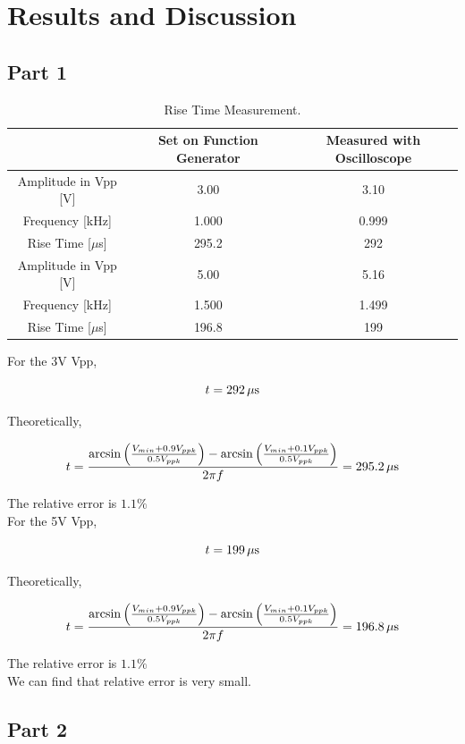 \documentclass{article}
\begin{document}
\section{Results and Discussion}

\subsection{Part 1}

\begin{table}[!h]
\begin{center}
\begin{tabular}{|c|c|c|}
\hline
 & Set on Function Generator & Measured with Oscilloscope \\
\hline
Amplitude in Vpp [V] 	&	3.00	&	3.10	\\
\hline
Frequency [kHz]			&	1.000	&	0.999	\\
\hline
Rise Time [$\mu$s]		&	295.2	&	292	\\
\hline
Amplitude in Vpp [V] 	&	5.00	&	5.16	\\
\hline
Frequency [kHz]			&	1.500	&	1.499	\\
\hline
Rise Time [$\mu$s]		&	196.8	&	199	\\
\hline
\end{tabular}
\caption{Rise Time Measurement.}
\label{tab-1}
\end{center}
\end{table}

For the 3V Vpp,

$$t=292\,\rm \mu s$$

Theoretically,

$$t=\frac{\arcsin\left(\frac{V_{min}+0.9V_{ppk}}{0.5V_{ppk}}\right)-\arcsin\left(\frac{V_{min}+0.1V_{ppk}}{0.5V_{ppk}}\right)}{2\pi f}=295.2\,\rm \mu s$$

The relative error is $1.1\%$\\

For the 5V Vpp,

$$t=199\,\rm \mu s$$

Theoretically,

$$t=\frac{\arcsin\left(\frac{V_{min}+0.9V_{ppk}}{0.5V_{ppk}}\right)-\arcsin\left(\frac{V_{min}+0.1V_{ppk}}{0.5V_{ppk}}\right)}{2\pi f}=196.8\,\rm \mu s$$

The relative error is $1.1\%$\\

We can find that relative error is very small.

\subsection{Part 2}
\end{document}
